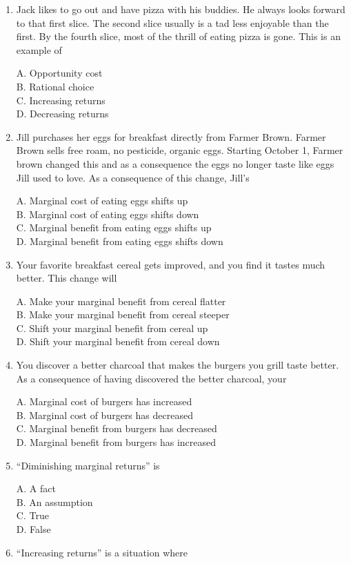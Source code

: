 \documentclass[
]{book}
\begin{document}
\begin{enumerate}
\def\labelenumi{\arabic{enumi}.}
\item
  Jack likes to go out and have pizza with his buddies. He always looks forward to that first slice. The second slice usually is a tad less enjoyable than the first. By the fourth slice, most of the thrill of eating pizza is gone. This is an example of

  A. Opportunity cost\\
  B. Rational choice\\
  C. Increasing returns\\
  D. Decreasing returns
\item
  Jill purchases her eggs for breakfast directly from Farmer Brown. Farmer Brown sells free roam, no pesticide, organic eggs. Starting October 1, Farmer brown changed this and as a consequence the eggs no longer taste like eggs Jill used to love. As a consequence of this change, Jill's

  A. Marginal cost of eating eggs shifts up\\
  B. Marginal cost of eating eggs shifts down\\
  C. Marginal benefit from eating eggs shifts up\\
  D. Marginal benefit from eating eggs shifts down
\item
  Your favorite breakfast cereal gets improved, and you find it tastes much better. This change will

  A. Make your marginal benefit from cereal flatter\\
  B. Make your marginal benefit from cereal steeper\\
  C. Shift your marginal benefit from cereal up\\
  D. Shift your marginal benefit from cereal down
\item
  You discover a better charcoal that makes the burgers you grill taste better. As a consequence of having discovered the better charcoal, your

  A. Marginal cost of burgers has increased\\
  B. Marginal cost of burgers has decreased\\
  C. Marginal benefit from burgers has decreased\\
  D. Marginal benefit from burgers has increased
\item
  ``Diminishing marginal returns'' is

  A. A fact\\
  B. An assumption\\
  C. True\\
  D. False
\item
  ``Increasing returns'' is a situation where


\end{enumerate}
\end{document}
